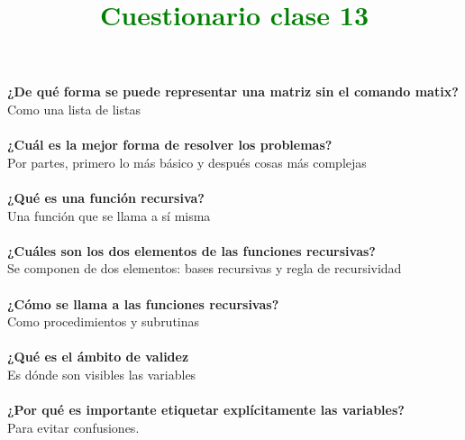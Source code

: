 \documentclass{book}
\begin{document}
	
	\begin{center}
		\title {\textcolor{green}{\Huge \textbf{Cuestionario clase 13}} }  
	\end{center}
	\textbf{¿De qué forma se puede representar una matriz sin el comando matix?}\\
	Como una lista de listas\\
	\\
	\textbf{¿Cuál es la mejor forma de resolver los problemas?}\\
	Por partes, primero lo más básico y después cosas más complejas\\
	\\
	\textbf{¿Qué es una función recursiva?}\\
	Una función que se llama a sí misma\\
	\\
	\textbf{¿Cuáles son los dos elementos de las funciones recursivas?}\\
	Se componen de dos elementos: bases recursivas y regla de recursividad\\
	\\
	\textbf{¿Cómo se llama a las funciones recursivas?}\\
	Como procedimientos y subrutinas\\
	\\
	\textbf{¿Qué es el ámbito de validez}\\
	Es dónde son visibles las variables\\
	\\
	\textbf{¿Por qué es importante etiquetar explícitamente las variables?}\\
	Para evitar confusiones.
	
\end{document}
